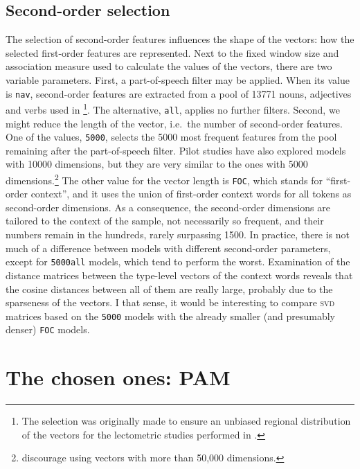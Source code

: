 \documentclass[
]{book}
\begin{document}
\hypertarget{soc}{%
\subsection{Second-order selection}\label{soc}}

The selection of second-order features influences the shape of the vectors: how the selected first-order features are represented. Next to the fixed window size and association measure used to calculate the values of the vectors, there are two variable parameters. First, a part-of-speech filter may be applied. When its value is \texttt{nav}, second-order features are extracted from a pool of 13771 nouns, adjectives and verbs used in \textcite{depascale_2019}\footnote{The selection was originally made to ensure an unbiased regional distribution of the vectors for the lectometric studies performed in \textcite{depascale_2019}.}. The alternative, \texttt{all}, applies no further filters. Second, we might reduce the length of the vector, i.e.~the number of second-order features. One of the values, \texttt{5000}, selects the 5000 most frequent features from the pool remaining after the part-of-speech filter. Pilot studies have also explored models with 10000 dimensions, but they are very similar to the ones with 5000 dimensions.\footnote{\textcite{kiela.clark_2014} discourage using vectors with more than 50,000 dimensions.} The other value for the vector length is \texttt{FOC}, which stands for ``first-order context'', and it uses the union of first-order context words for all tokens as second-order dimensions. As a consequence, the second-order dimensions are tailored to the context of the sample, not necessarily so frequent, and their numbers remain in the hundreds, rarely surpassing 1500. In practice, there is not much of a difference between models with different second-order parameters, except for \texttt{5000all} models, which tend to perform the worst. Examination of the distance matrices between the type-level vectors of the context words reveals that the cosine distances between all of them are really large, probably due to the sparseness of the vectors. I that sense, it would be interesting to compare \textsc{svd} matrices based on the \texttt{5000} models with the already smaller (and presumably denser) \texttt{FOC} models.

\hypertarget{pam}{%
\section{The chosen ones: PAM}\label{pam}}
\end{document}
